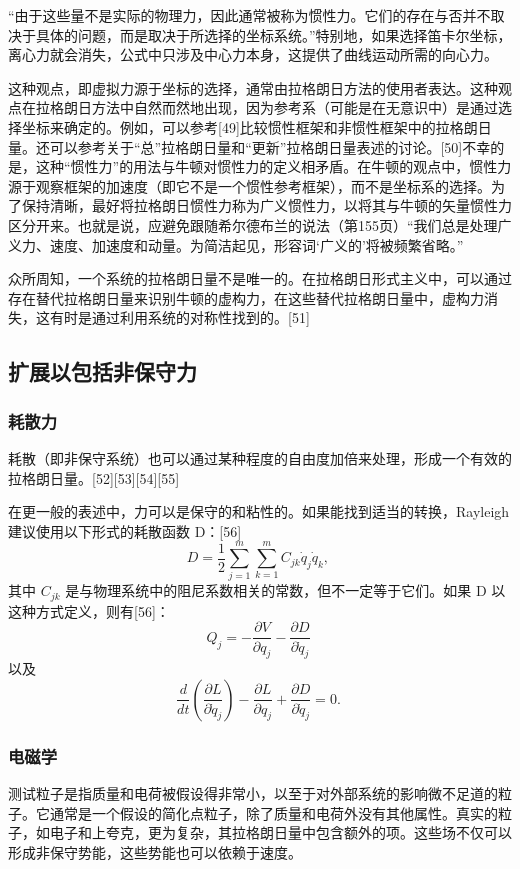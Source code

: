 “由于这些量不是实际的物理力，因此通常被称为惯性力。它们的存在与否并不取决于具体的问题，而是取决于所选择的坐标系统。”特别地，如果选择笛卡尔坐标，离心力就会消失，公式中只涉及中心力本身，这提供了曲线运动所需的向心力。

这种观点，即虚拟力源于坐标的选择，通常由拉格朗日方法的使用者表达。这种观点在拉格朗日方法中自然而然地出现，因为参考系（可能是在无意识中）是通过选择坐标来确定的。例如，可以参考[49]比较惯性框架和非惯性框架中的拉格朗日量。还可以参考关于“总”拉格朗日量和“更新”拉格朗日量表述的讨论。[50]不幸的是，这种“惯性力”的用法与牛顿对惯性力的定义相矛盾。在牛顿的观点中，惯性力源于观察框架的加速度（即它不是一个惯性参考框架），而不是坐标系的选择。为了保持清晰，最好将拉格朗日惯性力称为广义惯性力，以将其与牛顿的矢量惯性力区分开来。也就是说，应避免跟随希尔德布兰的说法（第155页）“我们总是处理广义力、速度、加速度和动量。为简洁起见，形容词‘广义的’将被频繁省略。”

众所周知，一个系统的拉格朗日量不是唯一的。在拉格朗日形式主义中，可以通过存在替代拉格朗日量来识别牛顿的虚构力，在这些替代拉格朗日量中，虚构力消失，这有时是通过利用系统的对称性找到的。[51]
\subsection{扩展以包括非保守力}
\subsubsection{耗散力}
耗散（即非保守系统）也可以通过某种程度的自由度加倍来处理，形成一个有效的拉格朗日量。[52][53][54][55]

在更一般的表述中，力可以是保守的和粘性的。如果能找到适当的转换，Rayleigh 建议使用以下形式的耗散函数 D：[56]
\[ D = \frac{1}{2} \sum_{j=1}^{m} \sum_{k=1}^{m} C_{jk} \dot{q}_{j} \dot{q}_{k},~ \]
其中 \( C_{jk} \) 是与物理系统中的阻尼系数相关的常数，但不一定等于它们。如果 D 以这种方式定义，则有[56]：
\[ Q_{j} = -\frac{\partial V}{\partial q_{j}} - \frac{\partial D}{\partial \dot{q}_{j}} ~\]
以及
\[ \frac{d}{dt} \left( \frac{\partial L}{\partial \dot{q}_{j}} \right) - \frac{\partial L}{\partial q_{j}} + \frac{\partial D}{\partial \dot{q}_{j}} = 0.~ \]
\subsubsection{电磁学}
测试粒子是指质量和电荷被假设得非常小，以至于对外部系统的影响微不足道的粒子。它通常是一个假设的简化点粒子，除了质量和电荷外没有其他属性。真实的粒子，如电子和上夸克，更为复杂，其拉格朗日量中包含额外的项。这些场不仅可以形成非保守势能，这些势能也可以依赖于速度。

